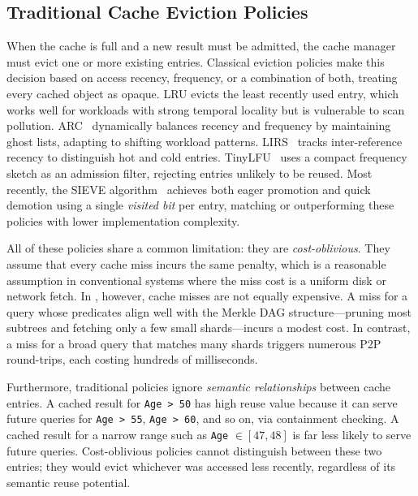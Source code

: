 \subsection{Traditional Cache Eviction Policies}
\label{sec:trad_eviction}

When the cache is full and a new result must be admitted, the cache manager must evict one or more existing entries.
Classical eviction policies make this decision based on access recency, frequency, or a combination of both, treating every cached object as opaque\cite{}.
LRU evicts the least recently used entry, which works well for workloads with strong temporal locality but is vulnerable to scan pollution.
ARC~\cite{megiddo2003arc} dynamically balances recency and frequency by maintaining ghost lists, adapting to shifting workload patterns.
LIRS~\cite{jiang2002lirs} tracks inter-reference recency to distinguish hot and cold entries.
TinyLFU~\cite{einziger2017tinylfu} uses a compact frequency sketch as an admission filter, rejecting entries unlikely to be reused.
Most recently, the SIEVE algorithm~\cite{zhang2024sieve} achieves both eager promotion and quick demotion using a single \emph{visited bit} per entry, matching or outperforming these policies with lower implementation complexity.

All of these policies share a common limitation: they are \emph{cost-oblivious}.
They assume that every cache miss incurs the same penalty, which is a reasonable assumption in conventional systems where the miss cost is a uniform disk or network fetch.
In \ours{}, however, cache misses are not equally expensive.
A miss for a query whose predicates align well with the Merkle DAG structure---pruning most subtrees and fetching only a few small shards---incurs a modest cost.
In contrast, a miss for a broad query that matches many shards triggers numerous P2P round-trips, each costing hundreds of milliseconds.

Furthermore, traditional policies ignore \emph{semantic relationships} between cache entries.
A cached result for \texttt{Age > 50} has high reuse value because it can serve future queries for \texttt{Age > 55}, \texttt{Age > 60}, and so on, via containment checking.
A cached result for a narrow range such as \texttt{Age} $\in [47, 48]$ is far less likely to serve future queries.
Cost-oblivious policies cannot distinguish between these two entries; they would evict whichever was accessed less recently, regardless of its semantic reuse potential.

